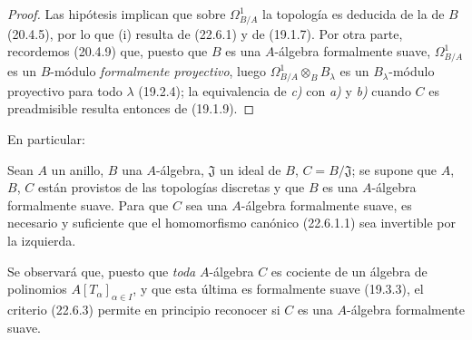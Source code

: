 \begin{proof}
Las hipótesis implican que sobre $\Omega^1_{B/A}$ la topología es deducida de
la de $B$ (20.4.5), por lo que (i) resulta de (22.6.1) y de (19.1.7). Por otra
parte, recordemos (20.4.9) que, puesto que $B$ es una $A$-álgebra formalmente
suave, $\Omega^1_{B/A}$ es un $B$-módulo \emph{formalmente proyectivo}, luego
$\Omega^1_{B/A}\otimes_BB_\lambda$ es un $B_\lambda$-módulo proyectivo para
todo $\lambda$ (19.2.4); la equivalencia de \emph{c)} con \emph{a)} y \emph{b)} cuando $C$ es
preadmisible resulta entonces de (19.1.9).
\end{proof}

En particular:

\begin{corollary}[22.6.3]
\label{0.22.6.3-fr}
Sean $A$ un anillo, $B$ una $A$-álgebra, $\mathfrak J$ un ideal de $B$,
$C=B/\mathfrak J$; se supone que $A$, $B$, $C$ están provistos de las topologías discretas
y que $B$ es una $A$-álgebra formalmente suave. Para que $C$ sea una
$A$-álgebra formalmente suave, es necesario y suficiente que el homomorfismo
canónico \textup{(22.6.1.1)} sea invertible por la izquierda.
\end{corollary}

Se observará que, puesto que \emph{toda} $A$-álgebra $C$ es cociente de un álgebra de
polinomios $A[T_\alpha]_{\alpha\in I}$, y que esta última es formalmente
suave (19.3.3), el criterio (22.6.3) permite en principio reconocer si $C$
es una $A$-álgebra formalmente suave.

